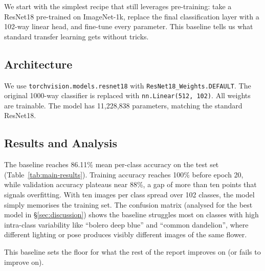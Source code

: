 We start with the simplest recipe that still leverages pre-training: take a ResNet18 pre-trained on ImageNet-1k, replace the final classification layer with a 102-way linear head, and fine-tune every parameter. This baseline tells us what standard transfer learning gets without tricks.

\subsection{Architecture}
We use \texttt{torchvision.models.resnet18} with \texttt{ResNet18\_Weights.DEFAULT}. The original 1000-way classifier is replaced with \texttt{nn.Linear(512, 102)}. All weights are trainable. The model has 11,228,838 parameters, matching the standard ResNet18.

\subsection{Results and Analysis}
The baseline reaches 86.11\% mean per-class accuracy on the test set (Table~\ref{tab:main-results}). Training accuracy reaches 100\% before epoch 20, while validation accuracy plateaus near 88\%, a gap of more than ten points that signals overfitting. With ten images per class spread over 102 classes, the model simply memorises the training set. The confusion matrix (analysed for the best model in \S\ref{sec:discussion}) shows the baseline struggles most on classes with high intra-class variability like ``bolero deep blue'' and ``common dandelion'', where different lighting or pose produces visibly different images of the same flower.

This baseline sets the floor for what the rest of the report improves on (or fails to improve on).
